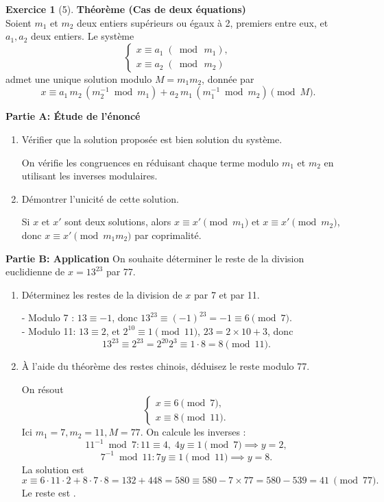 \documentclass{article}
\theoremstyle{definition}
\newtheorem{exercice}{Exercice}
\begin{document}
\begin{exercice}[5]
\textbf{Théorème (Cas de deux équations)}\\
Soient $m_1$ et $m_2$ deux entiers supérieurs ou égaux à 2, premiers entre eux, et $a_1,a_2$ deux entiers. Le système
\[\begin{cases}x\equiv a_1\; (\bmod\,m_1),\\x\equiv a_2\; (\bmod\,m_2)\end{cases}\]
admet une unique solution modulo $M=m_1m_2$, donnée par
\[x\equiv a_1\,m_2\,(m_2^{-1}\bmod m_1)+a_2\,m_1\,(m_1^{-1}\bmod m_2)\pmod M.\]

\textbf{Partie A: Étude de l'énoncé}
\begin{enumerate}
 \item Vérifier que la solution proposée est bien solution du système.

 On vérifie les congruences en réduisant chaque terme modulo $m_1$ et $m_2$ en utilisant les inverses modulaires.

 \item Démontrer l'unicité de cette solution.

 Si $x$ et $x'$ sont deux solutions, alors $x\equiv x'\pmod{m_1}$ et $x\equiv x'\pmod{m_2}$, donc $x\equiv x'\pmod{m_1m_2}$ par coprimalité.
\end{enumerate}

\textbf{Partie B: Application}
On souhaite déterminer le reste de la division euclidienne de $x=13^{23}$ par 77.
\begin{enumerate}
 \item Déterminez les restes de la division de $x$ par 7 et par 11.

 - Modulo 7 : $13\equiv-1$, donc $13^{23}\equiv(-1)^{23}=-1\equiv6\pmod7$.\\
 - Modulo 11: $13\equiv2$, et $2^{10}\equiv1\pmod{11}$, $23=2\times10+3$, donc
 \[13^{23}\equiv2^{23}=2^{20}2^3\equiv1\cdot8=8\pmod{11}.\]

 \item À l'aide du théorème des restes chinois, déduisez le reste modulo 77.

 On résout
 \[\begin{cases}x\equiv6\pmod7,\\x\equiv8\pmod{11}.
 \end{cases}\]
 Ici $m_1=7,m_2=11,M=77$. On calcule les inverses :
 \[11^{-1}\bmod7: 11\equiv4,\;4y\equiv1\pmod7\implies y=2,\]
 \[7^{-1}\bmod11:7y\equiv1\pmod{11}\implies y=8.\]
 La solution est
 \[x\equiv6\cdot11\cdot2+8\cdot7\cdot8=132+448=580\equiv580-7\times77=580-539=41\
 \pmod{77}.\]
 Le reste est .
\end{enumerate}


\end{exercice}
\end{document}
